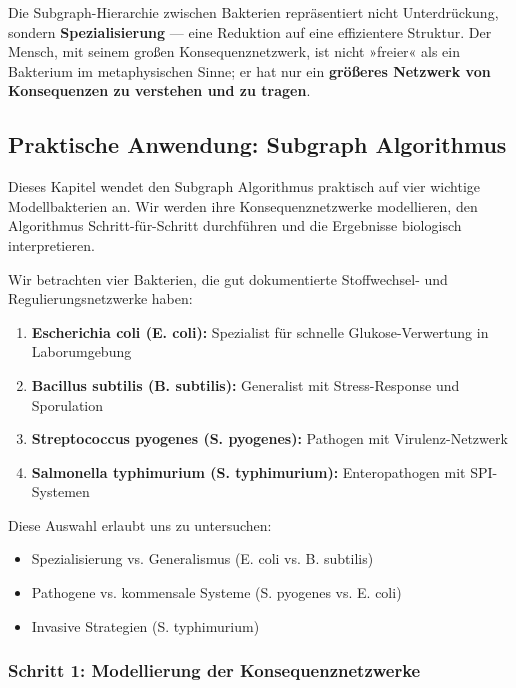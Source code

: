 \documentclass[a4paper,12pt]{article}
\theoremstyle{definition}
\begin{document}
Die Subgraph-Hierarchie zwischen Bakterien repräsentiert nicht Unterdrückung, sondern \textbf{Spezialisierung} --- eine Reduktion auf eine effizientere Struktur. Der Mensch, mit seinem großen Konsequenznetzwerk, ist nicht »freier« als ein Bakterium im metaphysischen Sinne; er hat nur ein \textbf{größeres Netzwerk von Konsequenzen zu verstehen und zu tragen}.

\subsection{Praktische Anwendung: Subgraph Algorithmus}

Dieses Kapitel wendet den Subgraph Algorithmus praktisch auf vier wichtige Modellbakterien an. Wir werden ihre Konsequenznetzwerke modellieren, den Algorithmus Schritt-für-Schritt durchführen und die Ergebnisse biologisch interpretieren.

Wir betrachten vier Bakterien, die gut dokumentierte Stoffwechsel- und Regulierungsnetzwerke haben:

\begin{enumerate}
    \item \textbf{Escherichia coli (E. coli):} Spezialist für schnelle Glukose-Verwertung in Laborumgebung
    \item \textbf{Bacillus subtilis (B. subtilis):} Generalist mit Stress-Response und Sporulation
    \item \textbf{Streptococcus pyogenes (S. pyogenes):} Pathogen mit Virulenz-Netzwerk
    \item \textbf{Salmonella typhimurium (S. typhimurium):} Enteropathogen mit SPI-Systemen
\end{enumerate}

Diese Auswahl erlaubt uns zu untersuchen:
\begin{itemize}
    \item Spezialisierung vs. Generalismus (E. coli vs. B. subtilis)
    \item Pathogene vs. kommensale Systeme (S. pyogenes vs. E. coli)
    \item Invasive Strategien (S. typhimurium)
\end{itemize}

\subsubsection{Schritt 1: Modellierung der Konsequenznetzwerke}
\end{document}
